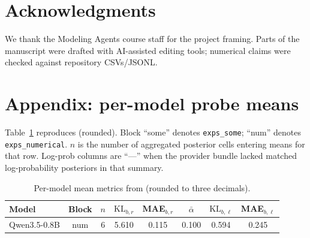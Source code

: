 \documentclass[11pt]{article}
\begin{document}
{\section*{Acknowledgments}

We thank the Modeling Agents course staff for the project framing. Parts of the manuscript were drafted with AI-assisted editing tools; numerical claims were checked against repository CSVs/JSONL.





\clearpage
\onecolumn
\appendix



\section{Appendix: per-model probe means}

\label{sec:appendix}



Table~\ref{tab:fullpanel} reproduces  (rounded). Block ``some'' denotes \texttt{exps\_some}; ``num'' denotes \texttt{exps\_numerical}. $n$ is the number of aggregated posterior cells entering means for that row. Log-prob columns are ``---'' when the provider bundle lacked matched log-probability posteriors in that summary.



\begin{table}[t]

  \centering

  \footnotesize

  \setlength{\tabcolsep}{4pt}

  \renewcommand{\arraystretch}{0.92}

  \caption{Per-model mean metrics from  (rounded to three decimals).}

  \label{tab:fullpanel}

  \begin{tabular}{@{}p{2.6cm}ccccccc@{}}

  \toprule

  Model & Block & $n$ & $\mathrm{KL}_{b,r}$ & MAE$_{b,r}$ & $\bar\alpha$ & $\mathrm{KL}_{b,\ell}$ & MAE$_{b,\ell}$ \\

  \midrule

  Qwen3.5-0.8B & num & 6 & 5.610 & 0.115 & 0.100 & 0.594 & 0.245 \\


\end{tabular}
\end{table}}
\end{document}
